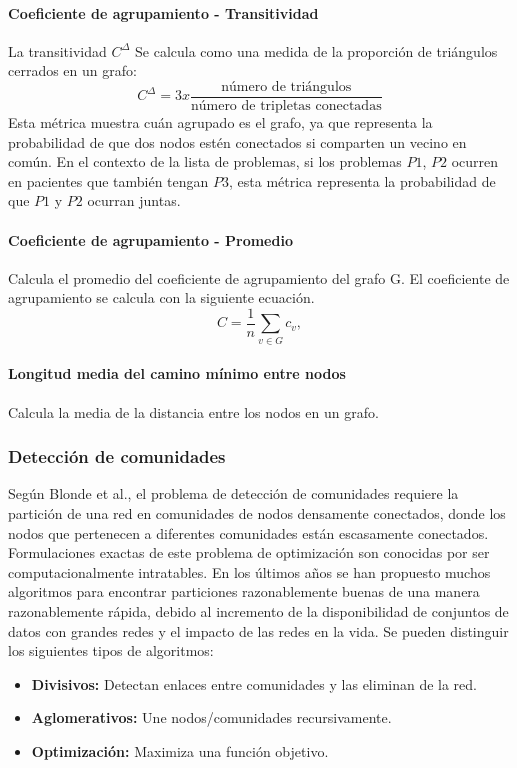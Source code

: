 \paragraph{Coeficiente de agrupamiento - Transitividad}
La transitividad\cite{Wasserman1994} $C^{\Delta}$ Se calcula como una medida de la proporción de triángulos cerrados en un grafo:
\begin{equation}
C^{\Delta} =3x\frac{\text{número de triángulos}}{\text{número de tripletas conectadas}}
\end{equation}
Esta métrica muestra cuán agrupado es el grafo, ya que representa la probabilidad de que dos nodos estén conectados si comparten un vecino en común. En el contexto de la lista de problemas, si los problemas $P1$, $P2$ ocurren en pacientes que también tengan $P3$, esta métrica representa la probabilidad de que $P1$ y $P2$ ocurran juntas.

\paragraph{Coeficiente de agrupamiento - Promedio}\cite{Saramaki2006,Kaiser2008}
Calcula el promedio del coeficiente de agrupamiento del grafo G. 
El coeficiente de agrupamiento se calcula con la siguiente ecuación.
\begin{equation}
C = \frac{1}{n}\sum_{v \in G} c_v,
\end{equation}

\paragraph{Longitud media del camino mínimo entre nodos}
Calcula la media de la distancia entre los nodos en un grafo.

\subsubsection{Detección de comunidades}
Según Blonde et al.\cite{Blondel2008FastNetworks}, el problema de detección de comunidades requiere la partición de una red en comunidades de nodos densamente conectados, donde los nodos que pertenecen a diferentes comunidades están escasamente conectados. Formulaciones exactas de este problema de optimización son conocidas por ser computacionalmente intratables. En los últimos años se han propuesto muchos algoritmos para encontrar particiones razonablemente buenas de una manera razonablemente rápida, debido al incremento de la disponibilidad de conjuntos de datos con grandes redes y el impacto de las redes en la vida. Se pueden distinguir los siguientes tipos de algoritmos:
% 
% 
\begin{itemize}
\item \textbf{Divisivos:} Detectan enlaces entre comunidades y las eliminan de la red. 
\item \textbf{Aglomerativos:} Une nodos/comunidades recursivamente.
\item \textbf{Optimización:} Maximiza una función objetivo.
\end{itemize}

